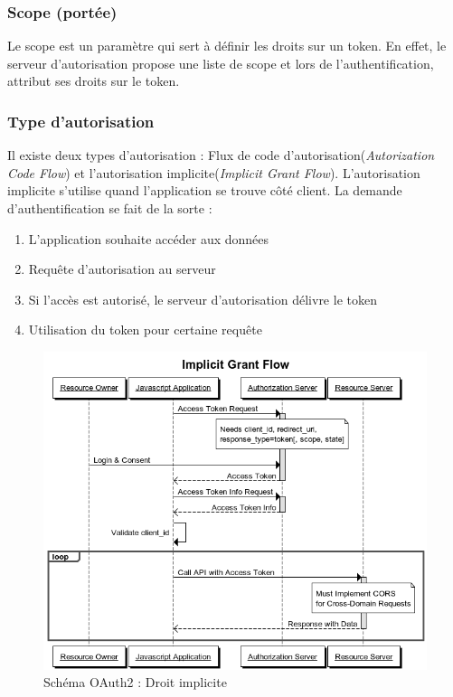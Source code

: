 \documentclass[11pt]{report} %
\begin{document}
			\subsubsection{Scope (portée)}
			Le scope est un paramètre qui sert à définir les droits sur un token. En effet, le serveur d'autorisation propose une liste de scope et lors de l'authentification, attribut ses droits sur le token.
			
			\subsubsection{Type d'autorisation}
			Il existe deux types d'autorisation : Flux de code d'autorisation(\textit{Autorization Code Flow}) et l'autorisation implicite(\textit{Implicit Grant Flow}). L'autorisation implicite s'utilise quand l'application se trouve côté client. La demande d'authentification se fait de la sorte :
			\begin{enumerate}
				\item L'application souhaite accéder aux données
				\item Requête d'autorisation au serveur
				\item Si l'accès est autorisé, le serveur d'autorisation délivre le token
				\item Utilisation du token pour certaine requête 
			\end{enumerate}
			
			\newpage
			
			\begin{figure}[h]
				\center
				\includegraphics[width=1\textwidth]{../img/SchemaOAuth2.png}
				\caption{Schéma OAuth2 : Droit implicite}
				\label{oauth2}
			\end{figure}
			
\end{document}
